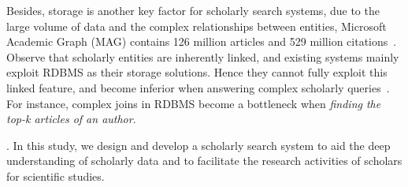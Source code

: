 %




Besides, storage is another key factor for scholarly search systems, due to the large volume of data and the complex relationships between entities, \eg Microsoft Academic Graph (MAG) contains 126 million articles and 529 million citations~\cite{sinha2015overview}.
Observe that scholarly entities are inherently linked, and existing systems mainly exploit RDBMS as their storage solutions. Hence they cannot fully exploit this linked feature, and become inferior when answering complex scholarly queries~\cite{BigGraphSearch}. For instance, complex joins in RDBMS become a bottleneck when {\em finding the top-k articles of an author}.





.
In this study, we design and develop a scholarly search system \oursystem  to aid the deep understanding of scholarly data and to facilitate  the research activities of scholars  for scientific studies.

